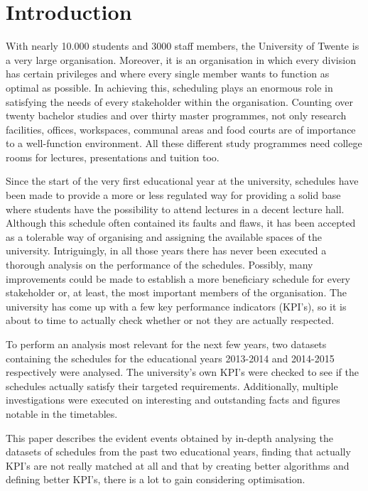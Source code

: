 \section{Introduction}
With nearly 10.000 students and 3000 staff members, the University of Twente is a very large organisation\cite{stats_uTwente}. Moreover, it is an organisation in which every division has certain privileges and where every single member wants to function as optimal as possible. In achieving this, scheduling plays an enormous role in satisfying the needs of every stakeholder within the organisation. Counting over twenty bachelor studies and over thirty master programmes, not only research facilities, offices, workspaces, communal areas and food courts are of importance to a well-function environment. All these different study programmes need college rooms for lectures, presentations and tuition too.

Since the start of the very first educational year at the university, schedules have been made to provide a more or less regulated way for providing a solid base where students have the possibility to attend lectures in a decent lecture hall. Although this schedule often contained its faults and flaws, it has been accepted as a tolerable way of organising and assigning the available spaces of the university. Intriguingly, in all those years there has never been executed a thorough analysis on the performance of the schedules. Possibly, many improvements could be made to establish a more beneficiary schedule for every stakeholder or, at least, the most important members of the organisation. The university has come up with a few key performance indicators (KPI’s), so it is about to time to actually check whether or not they are actually respected.

To perform an analysis most relevant for the next few years, two datasets containing the schedules for the educational years 2013-2014 and 2014-2015 respectively were analysed. The university’s own KPI’s were checked to see if the schedules actually satisfy their targeted requirements. Additionally, multiple investigations were executed on interesting and outstanding facts and figures notable in the timetables.

This paper describes the evident events obtained by in-depth analysing the datasets of schedules from the past two educational years, finding that actually KPI’s are not really matched at all and that by creating better algorithms and defining better KPI’s, there is a lot to 
gain considering optimisation.